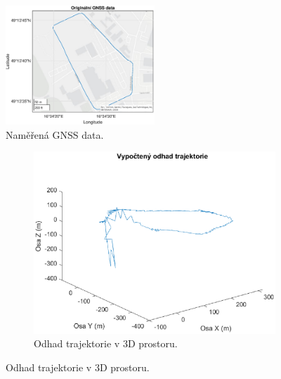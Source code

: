 \begin{figure}[h]
     \centering
         \includegraphics[width=0.5\textwidth]{obrazky/matlab/2gnss}
         \caption{Naměřená GNSS data.}
        \label{fig:gnssOriginal}
\end{figure}

\begin{figure}[h]
     \centering
     \begin{subfigure}[b]{0.49\textwidth}
         \centering
         \includegraphics[width=\textwidth]{obrazky/matlab/2gnssIMU3d}
         \caption{Odhad trajektorie v 3D prostoru.}   
         

\end{subfigure}
\end{figure}
